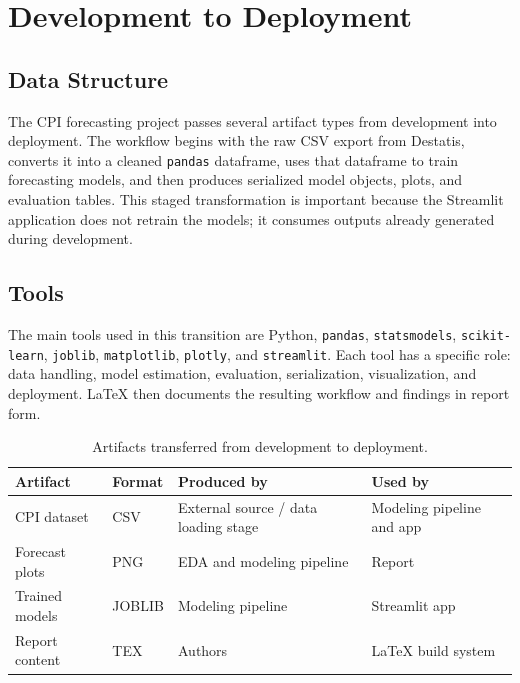 %
%
%

\chapter{Development to Deployment}

\section{Data Structure}

The CPI forecasting project passes several artifact types from development into deployment. The workflow begins with the raw CSV export from Destatis, converts it into a cleaned \texttt{pandas} dataframe, uses that dataframe to train forecasting models, and then produces serialized model objects, plots, and evaluation tables. This staged transformation is important because the Streamlit application does not retrain the models; it consumes outputs already generated during development.

\section{Tools}

The main tools used in this transition are Python, \texttt{pandas}, \texttt{statsmodels}, \texttt{scikit-learn}, \texttt{joblib}, \texttt{matplotlib}, \texttt{plotly}, and \texttt{streamlit}. Each tool has a specific role: data handling, model estimation, evaluation, serialization, visualization, and deployment. LaTeX then documents the resulting workflow and findings in report form.

\begin{table}[htbp]
	\centering
	\caption{Artifacts transferred from development to deployment.}
	\label{tab:dev-to-dep-artifacts}
	\begin{tabular}{p{3cm}p{2cm}p{3.5cm}p{4cm}}
		\hline
		Artifact & Format & Produced by & Used by \\
		\hline
		CPI dataset & CSV & External source / data loading stage & Modeling pipeline and app \\
		Forecast plots & PNG & EDA and modeling pipeline & Report \\
		Trained models & JOBLIB & Modeling pipeline & Streamlit app \\
		Report content & TEX & Authors & LaTeX build system \\
		\hline
	\end{tabular}
\end{table}

